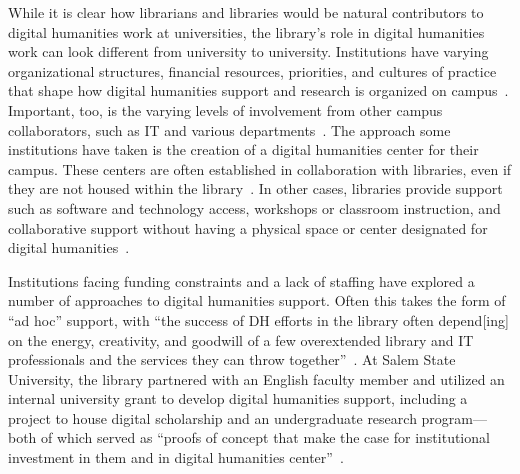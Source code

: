 \documentclass[final]{anthology-ch}
\begin{document}
While it is clear how librarians and libraries would be natural contributors to digital humanities work at universities, the library's role in digital humanities work can look different from university to university. Institutions have varying organizational structures, financial resources, priorities, and cultures of practice that shape how digital humanities support and research is organized on campus~\cite[pp.~43--45]{posner2013half}. Important, too, is the varying levels of involvement from other campus collaborators, such as IT and various departments~\cite[p.~11]{anne2017building}. The approach some institutions have taken is the creation of a digital humanities center for their campus. These centers are often established in collaboration with libraries, even if they are not housed within the library~\cite{white2016preface}. In other cases, libraries provide support such as software and technology access, workshops or classroom instruction, and collaborative support without having a physical space or center designated for digital humanities~\cite{habing2025digital}.

Institutions facing funding constraints and a lack of staffing have explored a number of approaches to digital humanities support. Often this takes the form of \enquote{ad hoc} support, with \enquote{the success of DH efforts in the library often depend[ing] on the energy, creativity, and goodwill of a few overextended library and IT professionals and the services they can throw together}~\cite{bellc2015practice}. At Salem State University, the library partnered with an English faculty member and utilized an internal university grant to develop digital humanities support, including a project to house digital scholarship and an undergraduate research program---both of which served as \enquote{proofs of concept that make the case for institutional investment in them and in digital humanities center}~\cite[p.~348]{risam2017building}.
\end{document}
